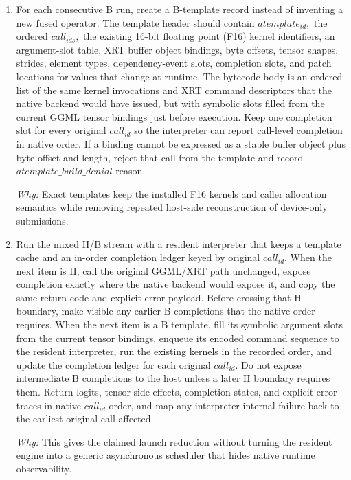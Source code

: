 \documentclass[10pt,a4paper]{article}
\begin{document}
\begin{enumerate}[leftmargin=*,start=3]
  \item For each consecutive B run, create a B-template record instead of inventing a new fused operator. The template header should contain \(a template_{id},\) the ordered \(call_{ids},\) the existing 16-bit floating point (F16) kernel identifiers, an argument-slot table, XRT buffer object bindings, byte offsets, tensor shapes, strides, element types, dependency-event slots, completion slots, and patch locations for values that change at runtime. The bytecode body is an ordered list of the same kernel invocations and XRT command descriptors that the native backend would have issued, but with symbolic slots filled from the current GGML tensor bindings just before execution. Keep one completion slot for every original \(call_{id}\) so the interpreter can report call-level completion in native order. If a binding cannot be expressed as a stable buffer object plus byte offset and length, reject that call from the template and record \(a \mathit{template\_build\_denial}\) reason.
\par\emph{Why:} Exact templates keep the installed F16 kernels and caller allocation semantics while removing repeated host-side reconstruction of device-only submissions.
  \item Run the mixed H/B stream with a resident interpreter that keeps a template cache and an in-order completion ledger keyed by original \(call_{id}.\) When the next item is H, call the original GGML/XRT path unchanged, expose completion exactly where the native backend would expose it, and copy the same return code and explicit error payload. Before crossing that H boundary, make visible any earlier B completions that the native order requires. When the next item is a B template, fill its symbolic argument slots from the current tensor bindings, enqueue its encoded command sequence to the resident interpreter, run the existing kernels in the recorded order, and update the completion ledger for each original \(call_{id}.\) Do not expose intermediate B completions to the host unless a later H boundary requires them. Return logits, tensor side effects, completion states, and explicit-error traces in native \(call_{id}\) order, and map any interpreter internal failure back to the earliest original call affected.
\par\emph{Why:} This gives the claimed launch reduction without turning the resident engine into a generic asynchronous scheduler that hides native runtime observability.
\end{enumerate}
\end{document}
